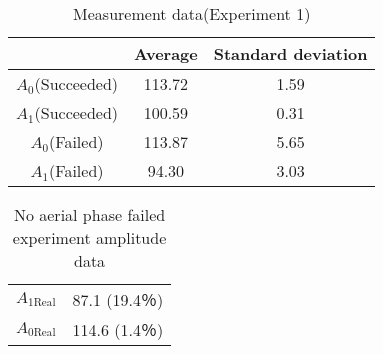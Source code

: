               \begin{table}[bh]
                \begin{center}
                  \caption{Measurement data(Experiment 1)}
                  \vspace{2mm}
                  \begin{tabular}{c|cc}
                    \hline
                     & Average & Standard deviation\\
                    \hline
                    $A_0$(Succeeded)& 113.72& 1.59\\
                    $A_1$(Succeeded)& 100.59& 0.31\\
                    $A_0$(Failed)& 113.87& 5.65\\
                    $A_1$(Failed)& 94.30& 3.03\\                      
                    \hline
                  \end{tabular}
                \end{center}
              \end{table}
        \newpage
        \clearpage
        \begin{table}[t]
                \begin{center}
                  \caption{No aerial phase failed experiment amplitude data}
                  \vspace{2mm}
                  \begin{tabular}{c|c}
                    \hline
                    $A_{\mathrm{1Real}}$ & 87.1 (19.4％)\\
                    $A_{\mathrm{0Real}}$ & 114.6 (1.4％)\\                      
                    \hline
                  \end{tabular}
                \end{center}
              \end{table}
        
              